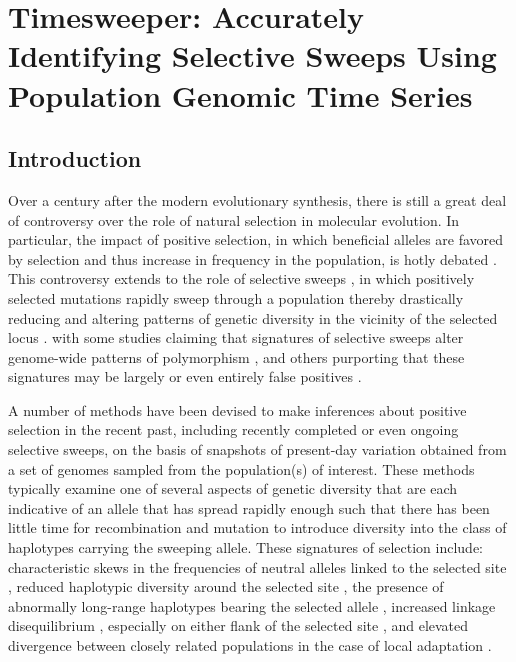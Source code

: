 \chapter{Timesweeper: Accurately Identifying Selective Sweeps Using Population Genomic Time Series}

\section{Introduction}

Over a century after the modern evolutionary synthesis, there is still a great deal of controversy over the role of natural selection in molecular evolution. In particular, the impact of positive selection, in which beneficial alleles are favored by selection and thus increase in frequency in the population, is hotly debated \cite{hahnSelectionTheoryMolecular2008,jensenImportanceNeutralTheory2019,kernNeutralTheoryLight2018}. This controversy extends to the role of selective sweeps \cite{stephanGeneticHitchhikingBackground2010}, in which positively selected mutations rapidly sweep through a population thereby drastically reducing and altering patterns of genetic diversity in the vicinity of the selected locus \cite{kaplanHitchhikingEffectRevisited1989,smithHitchhikingEffectFavourable1974}. with some studies claiming that signatures of selective sweeps alter genome-wide patterns of polymorphism \cite{bookerSelectiveSweepsInfluence2021,enardGenomewideSignalsPositive2014,garudRecentSelectiveSweeps2015,garudElevatedLinkageDisequilibrium2016,schriderSoftSweepsAre2017}, and others purporting that these signatures may be largely or even entirely false positives \cite{harrisUnfoundedEnthusiasmSoft2018}.

A number of methods have been devised to make inferences about positive selection in the recent past, including recently completed or even ongoing selective sweeps, on the basis of snapshots of present-day variation obtained from a set of genomes sampled from the population(s) of interest. These methods typically examine one of several aspects of genetic diversity that are each indicative of an allele that has spread rapidly enough such that there has been little time for recombination and mutation to introduce diversity into the class of haplotypes carrying the sweeping allele. These signatures of selection include: characteristic skews in the frequencies of neutral alleles linked to the selected site \cite{fayHitchhikingPositiveDarwinian2000,kimDetectingLocalSignature2002,liNewTestDetecting2011}, reduced haplotypic diversity around the selected site \cite{garudRecentSelectiveSweeps2015,harrisLikelihoodApproachUncovering2020,hudsonEvidencePositiveSelection1994}, the presence of abnormally long-range haplotypes bearing the selected allele \cite{ferrer-admetllaDetectingIncompleteSoft2014,sabetiDetectingRecentPositive2002,voightMapRecentPositive2006}, increased linkage disequilibrium \cite{kellyTestNeutralityBased1997}, especially on either flank of the selected site \cite{kimLinkageDisequilibriumSignature2004}, and elevated divergence between closely related populations in the case of local adaptation \cite{chenPopulationDifferentiationTest2010}.

